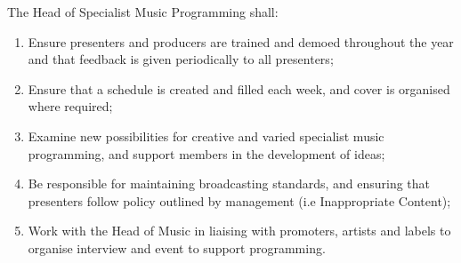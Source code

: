 \item The Head of Specialist Music Programming shall:
\begin{enumerate}[label*=\arabic*.]
    \item Ensure presenters and producers are trained and demoed throughout the year and that feedback is given periodically to all presenters;
    \item Ensure that a schedule is created and filled each week, and cover is organised where required;
    \item Examine new possibilities for creative and varied specialist music programming, and support members in the development of ideas;
    \item Be responsible for maintaining broadcasting standards, and ensuring that presenters follow policy outlined by management (i.e Inappropriate Content);
    \item Work with the Head of Music in liaising with promoters, artists and labels to organise interview and event to support programming.
\end{enumerate}
